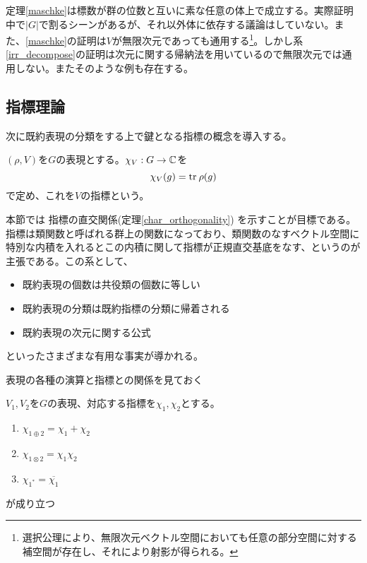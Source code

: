 \documentclass{ltjsreport}
\begin{document}
\begin{notice}
  定理\ref{maschke}は標数が群の位数と互いに素な任意の体上で成立する。実際証明中で$|G|$で割るシーンがあるが、それ以外体に依存する議論はしていない。また、\ref{maschke}の証明は$V$が無限次元であっても通用する\footnote{
    選択公理により、無限次元ベクトル空間においても任意の部分空間に対する補空間が存在し、それにより射影が得られる。
  }。しかし系\ref{irr_decompose}の証明は次元に関する帰納法を用いているので無限次元では通用しない。またそのような例も存在する。

  
\end{notice}





\subsection{指標理論}

次に既約表現の分類をする上で鍵となる指標の概念を導入する。

\begin{defin}
  $(\rho,V)$を$G$の表現とする。$\chi_V:G\rightarrow\mathbb{C}$を
  \[
  \chi_V(g)=\text{tr}\: \rho(g)
  \]
  で定め、これを$V$の指標という。
\end{defin}

本節では
指標の直交関係(定理\ref{char_orthogonality})
を示すことが目標である。指標は類関数と呼ばれる群上の関数になっており、類関数のなすベクトル空間に特別な内積を入れるとこの内積に関して指標が正規直交基底をなす、というのが主張である。この系として、
\begin{itemize}
  \item 既約表現の個数は共役類の個数に等しい
  \item 既約表現の分類は既約指標の分類に帰着される
  \item 既約表現の次元に関する公式
\end{itemize}
といったさまざまな有用な事実が導かれる。

表現の各種の演算と指標との関係を見ておく

\begin{prop}\label{char_property}
  $V_1,V_2$を$G$の表現、対応する指標を$\chi_1,\chi_2$とする。
  \begin{enumerate}
    \item $\chi_{1\oplus 2}=\chi_1+\chi_2$
    \item $\chi_{1\otimes 2}=\chi_1\chi_2$
    \item $\chi_{1^*}=\overline{\chi_1}$
  \end{enumerate}
  が成り立つ
\end{prop}
\end{document}
